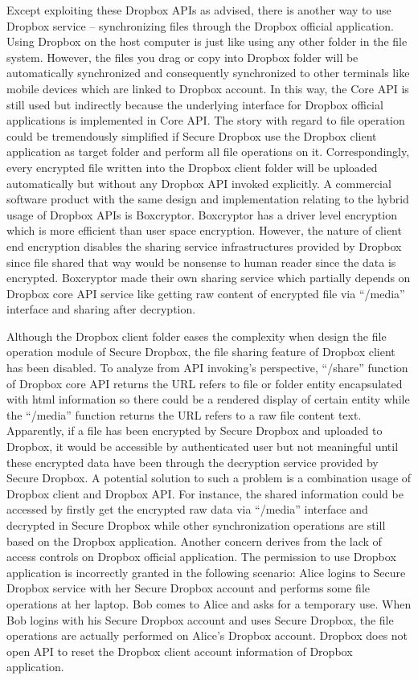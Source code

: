 Except exploiting these Dropbox APIs as advised, there is another way to use Dropbox service – synchronizing files through the Dropbox official application. Using Dropbox on the host computer is just like using any other folder in the file system. However, the files you drag or copy into Dropbox folder will be automatically synchronized and consequently synchronized to other terminals like mobile devices which are linked to Dropbox account. In this way, the Core API is still used but indirectly because the underlying interface for Dropbox official applications is implemented in Core API. The story with regard to file operation could be tremendously simplified if Secure Dropbox use the Dropbox client application as target folder and perform all file operations on it. Correspondingly, every encrypted file written into the Dropbox client folder will be uploaded automatically but without any Dropbox API invoked explicitly. A commercial software product with the same design and implementation relating to the hybrid usage of Dropbox APIs is Boxcryptor\cite{BoxCryptor2013}. Boxcryptor has a driver level encryption which is more efficient than user space encryption. However, the nature of client end encryption disables the sharing service infrastructures provided by Dropbox since file shared that way would be nonsense to human reader since the data is encrypted. Boxcryptor made their own sharing service which partially depends on Dropbox core API service like getting raw content of encrypted file via ``/media'' interface and sharing after decryption.

Although the Dropbox client folder eases the complexity when design the file operation module of Secure Dropbox, the file sharing feature of Dropbox client has been disabled. To analyze from API invoking’s perspective, ``/share'' function of Dropbox core API returns the URL refers to file or folder entity encapsulated with html information so there could be a rendered display of certain entity while the ``/media'' function returns the URL refers to a raw file content text. Apparently, if a file has been encrypted by Secure Dropbox and uploaded to Dropbox, it would be accessible by authenticated user but not meaningful until these encrypted data have been through the decryption service provided by Secure Dropbox. A potential solution to such a problem is a combination usage of Dropbox client and Dropbox API. For instance, the shared information could be accessed by firstly get the encrypted raw data via ``/media'' interface and decrypted in Secure Dropbox while other synchronization operations are still based on the Dropbox application. Another concern derives from the lack of access controls on Dropbox official application. The permission to use Dropbox application is incorrectly granted in the following scenario: Alice logins to Secure Dropbox service with her Secure Dropbox account and performs some file operations at her laptop. Bob comes to Alice and asks for a temporary use. When Bob logins with his Secure Dropbox account and uses Secure Dropbox, the file operations are actually performed on Alice’s Dropbox account. Dropbox does not open API to reset the Dropbox client account information of Dropbox application.

